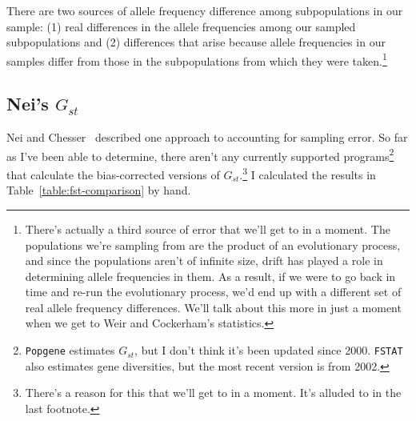There are two sources of allele frequency difference among
subpopulations in our sample: (1) real differences in the allele
frequencies among our sampled subpopulations and (2) differences that
arise because allele frequencies in our samples differ from those in
the subpopulations from which they were taken.\footnote{There's
  actually a third source of error that we'll get to in a moment. The
  populations we're sampling from are the product of an evolutionary
  process, and since the populations aren't of infinite size, drift
  has played a role in determining allele frequencies in them. As a
  result, if we were to go back in time and re-run the evolutionary
  process, we'd end up with a different set of real allele frequency
  differences. We'll talk about this more in just a moment when we get
  to Weir and Cockerham's statistics.}

\subsection*{Nei's $G_{st}$}

Nei and Chesser~\cite{Nei-Chesser-1983} described one approach to
accounting for sampling error. So far as I've been able to determine,
there aren't any currently supported programs\footnote{{\tt Popgene}
  estimates $G_{st}$, but I don't think it's been updated since
  2000. {\tt FSTAT} also estimates gene diversities, but the most
  recent version is from 2002.}
that calculate the bias-corrected versions of
$G_{st}$.\footnote{There's a reason for this that we'll get to in a
  moment. It's alluded to in the last footnote.} I calculated the
results in Table~\ref{table:fst-comparison} by hand.

